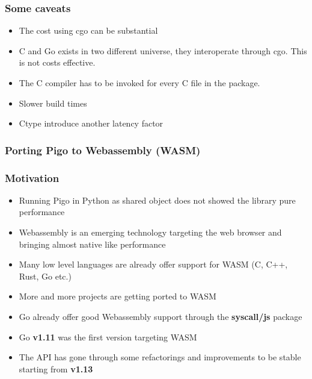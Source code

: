 \documentclass[9pt]{beamer}
\begin{document}
\begin{frame}[fragile]
\frametitle{Some caveats}


\begin{itemize}
\item The cost using cgo can be substantial
\item C and Go exists in two different universe, they interoperate through cgo. This is not costs effective.
\item The C compiler has to be invoked for every C file in the package.
\item Slower build times
\item Ctype introduce another latency factor
\end{itemize}


\end{frame}

\begin{frame}[fragile]
\frametitle{Porting Pigo to Webassembly (WASM)}


\end{frame}

\begin{frame}[fragile]
\frametitle{Motivation}


\begin{itemize}
\item Running Pigo in Python as shared object does not showed the library pure performance
\item Webassembly is an emerging technology targeting the web browser and bringing almost native like performance
\item Many low level languages are already offer support for WASM (C, C++, Rust, Go etc.)
\item More and more projects are getting ported to WASM
\item Go already offer good Webassembly support through the \textbf{syscall/js} package
\item Go \textbf{v1.11} was the first version targeting WASM
\item The API has gone through some refactorings and improvements to be stable starting from \textbf{v1.13}
\end{itemize}


\end{frame}
\end{document}
